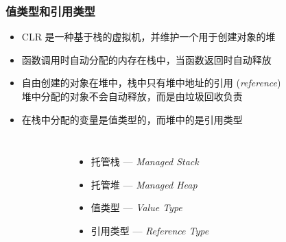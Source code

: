 \begin{frame}
\frametitle{值类型和引用类型}
\begin{itemize}
\item<1-| handout:1> \small CLR 是一种基于栈的虚拟机，并维护一个用于创建对象的堆
\item<2-| handout:1> \small 函数调用时自动分配的内存在栈中，当函数返回时自动释放
\item<3-| handout:1> \small 自由创建的对象在堆中，栈中只有堆中地址的引用 (\textit{reference}) \\
  \small 堆中分配的对象不会自动释放，而是由垃圾回收负责
\item<4-| handout:1> \small 在栈中分配的变量是值类型的，而堆中的是引用类型
\end{itemize}

\begin{columns}
  \begin{figure}[h] 
    \centering 
  \end{figure}
  \begin{itemize}
  \item<1-| handout:1> \small 托管栈 --- \textit{Managed Stack}
  \item<1-| handout:1> \small 托管堆 --- \textit{Managed Heap}
  \item<4-| handout:1> \small 值类型 --- \textit{Value Type}
  \item<4-| handout:1> \small 引用类型 --- \textit{Reference Type}
  \end{itemize}

\end{columns}


\end{frame}

